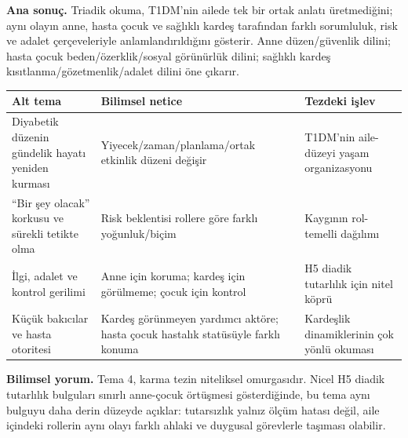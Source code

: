 \documentclass[
  turkish,
  a4paper,
  DIV=11,
  numbers=noendperiod]{scrreprt}
\newcounter{none} %
\begin{document}
\textbf{Ana sonuç.} Triadik okuma, T1DM'nin ailede tek bir ortak anlatı
üretmediğini; aynı olayın anne, hasta çocuk ve sağlıklı kardeş
tarafından farklı sorumluluk, risk ve adalet çerçeveleriyle
anlamlandırıldığını gösterir. Anne düzen/güvenlik dilini; hasta çocuk
beden/özerklik/sosyal görünürlük dilini; sağlıklı kardeş
kısıtlanma/gözetmenlik/adalet dilini öne çıkarır.

{\def\LTcaptype{none} %
\begin{longtable}[]{@{}
  >{\raggedright\arraybackslash}p{}
  >{\raggedright\arraybackslash}p{}
  >{\raggedright\arraybackslash}p{}@{}}
\toprule\noalign{}
\begin{minipage}[b]{\linewidth}\raggedright
Alt tema
\end{minipage} & \begin{minipage}[b]{\linewidth}\raggedright
Bilimsel netice
\end{minipage} & \begin{minipage}[b]{\linewidth}\raggedright
Tezdeki işlev
\end{minipage} \\
\midrule\noalign{}
\endhead
\bottomrule\noalign{}
\endlastfoot
Diyabetik düzenin gündelik hayatı yeniden kurması &
Yiyecek/zaman/planlama/ortak etkinlik düzeni değişir & T1DM'nin
aile-düzeyi yaşam organizasyonu \\
``Bir şey olacak'' korkusu ve sürekli tetikte olma & Risk beklentisi
rollere göre farklı yoğunluk/biçim & Kaygının rol-temelli dağılımı \\
İlgi, adalet ve kontrol gerilimi & Anne için koruma; kardeş için
görülmeme; çocuk için kontrol & H5 diadik tutarlılık için nitel köprü \\
Küçük bakıcılar ve hasta otoritesi & Kardeş görünmeyen yardımcı aktöre;
hasta çocuk hastalık statüsüyle farklı konuma & Kardeşlik dinamiklerinin
çok yönlü okuması \\
\end{longtable}
}

\textbf{Bilimsel yorum.} Tema 4, karma tezin niteliksel omurgasıdır.
Nicel H5 diadik tutarlılık bulguları sınırlı anne-çocuk örtüşmesi
gösterdiğinde, bu tema aynı bulguyu daha derin düzeyde açıklar:
tutarsızlık yalnız ölçüm hatası değil, aile içindeki rollerin aynı olayı
farklı ahlaki ve duygusal görevlerle taşıması olabilir.
\end{document}
